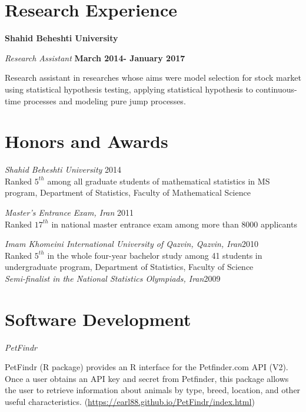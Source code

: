 \documentclass[margin,line]{res}
\begin{document}
\begin{resume}
\section{\sc Research Experience}
{\bf Shahid Beheshti University}

{\em Research Assistant } \hfill {\bf March 2014- January 2017}

\vspace{-.3cm}
Research assistant in researches whose aims were  model selection for stock market using statistical hypothesis testing, applying statistical hypothesis to continuous-time processes and modeling pure jump processes.



\section{\sc Honors and Awards}

{\em Shahid Beheshti University} \hfill 2014\\
 Ranked $5^{th}$ among all graduate students of mathematical statistics in MS program, Department of Statistics, Faculty of Mathematical Science 
 
{\em Master's Entrance Exam, Iran} \hfill 2011\\
Ranked $17^{th}$ in national master entrance exam among more than 8000 applicants 

{\em Imam Khomeini International University of Qazvin, Qazvin, Iran}\hfill 2010\\
Ranked $5^{th}$ in the whole four-year bachelor study among 41 students in undergraduate program, Department of Statistics, Faculty of Science\\

{\em Semi-finalist in the National Statistics Olympiads, Iran}\hfill 2009


\section{\sc Software Development}


{\em PetFindr}

\vspace{-.3cm}
PetFindr (R package) provides an R interface for the Petfinder.com API (V2). Once a user obtains an API key and secret from Petfinder, this package allows the user to retrieve information about animals by type, breed, location, and other useful characteristics. (\url{https://earl88.github.io/PetFindr/index.html})




\end{resume}
\end{document}
